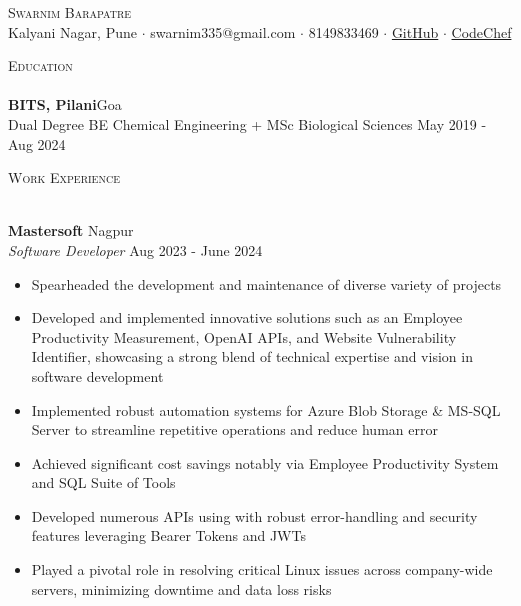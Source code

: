 \documentclass[a4paper]{article}
\newcommand{\lineunder} {
\vspace*{-8pt} \\
\hspace*{-18pt} \hrulefill \\
}
\newcommand{\header} [1] {
{\hspace*{-18pt}\vspace*{6pt} \textsc{#1}}
\vspace*{-6pt} \lineunder
}
\begin{document}
\vspace*{-40pt}

\vspace*{-10pt}
\begin{center}
{\Huge \scshape {Swarnim Barapatre}}\\
Kalyani Nagar, Pune $\cdot$ swarnim335@gmail.com $\cdot$ 8149833469 $\cdot$ \href{https://github.com/swarnimcodes/}{GitHub} $\cdot$ \href{https://www.codechef.com/users/b_swarniim}{CodeChef} \\
\end{center}

\header{Education}

\textbf{BITS, Pilani}\hfill Goa\\
Dual Degree BE Chemical Engineering + MSc Biological Sciences \hfill May 2019 - Aug 2024\\

\vspace{2mm}

\header{Work Experience}
\vspace{1mm}

\textbf{Mastersoft} \hfill Nagpur\\
\textit{Software Developer} \hfill Aug 2023 - June 2024\\
\vspace{-1mm}
\begin{itemize} \itemsep 1pt
\item Spearheaded the development and maintenance of diverse variety of projects
\item Developed and implemented innovative solutions such as an Employee Productivity Measurement, OpenAI APIs, and 
Website Vulnerability Identifier, showcasing a strong blend of technical expertise and vision in software development
\item Implemented robust automation systems for Azure Blob Storage \& MS-SQL Server to streamline repetitive operations and reduce human error
\item Achieved significant cost savings notably via Employee Productivity System and SQL Suite of Tools
\item Developed numerous APIs using with robust error-handling and security features leveraging Bearer Tokens and JWTs
\item Played a pivotal role in resolving critical Linux issues across company-wide servers, minimizing downtime and data loss risks
\end{itemize}
\end{document}
